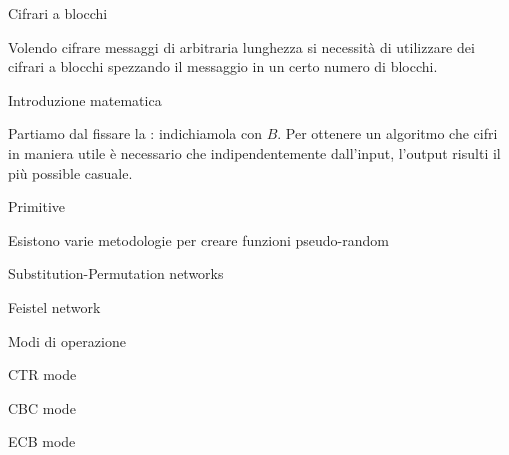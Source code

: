 \capitolo Cifrari a blocchi

Volendo cifrare messaggi di arbitraria lunghezza si necessit\`a di utilizzare dei
cifrari a blocchi spezzando il messaggio in un certo numero di blocchi.

\sezione Introduzione matematica

Partiamo dal fissare la : indichiamola con $B$.
Per ottenere un algoritmo che cifri in maniera utile \`e necessario che indipendentemente
dall'input, l'output risulti il pi\`u possible casuale.

\sezione Primitive

Esistono varie metodologie per creare funzioni pseudo-random

\sottosezione Substitution-Permutation networks

\sottosezione Feistel network


\sezione Modi di operazione

\sottosezione CTR mode

\sottosezione CBC mode

\sottosezione ECB mode

